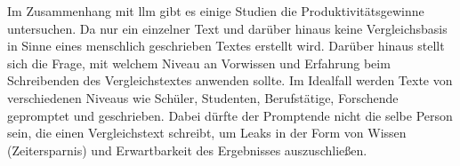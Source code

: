 
Im Zusammenhang mit \gls{llm} gibt es einige Studien  die Produktivitätsgewinne untersuchen. Da nur ein einzelner Text und darüber hinaus keine Vergleichsbasis in Sinne eines menschlich geschrieben Textes erstellt wird. Darüber hinaus stellt sich die Frage, mit welchem Niveau an Vorwissen und Erfahrung beim Schreibenden des Vergleichstextes anwenden sollte. Im Idealfall werden Texte von verschiedenen Niveaus wie Schüler, Studenten, Berufstätige, Forschende gepromptet und geschrieben. Dabei dürfte der Promptende nicht die selbe Person sein, die einen Vergleichstext schreibt, um Leaks in der Form von Wissen (Zeitersparnis) und Erwartbarkeit des Ergebnisses auszuschließen.
